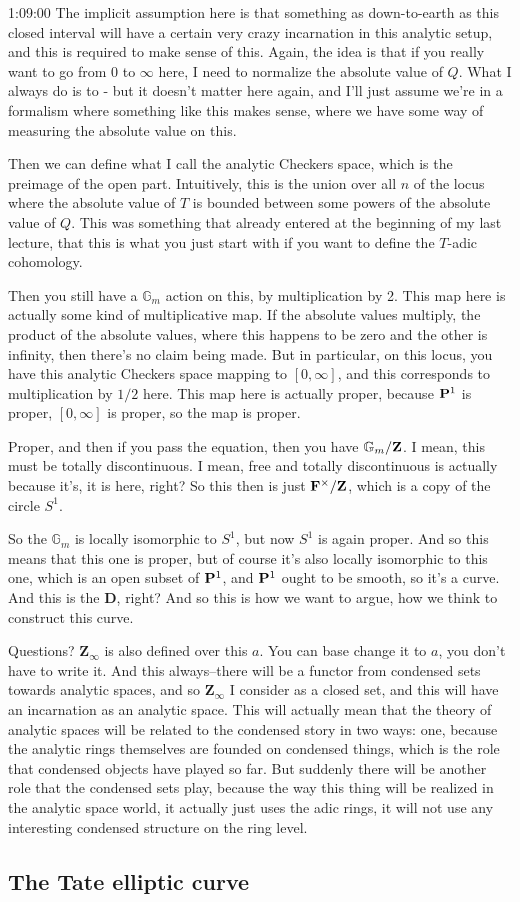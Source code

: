 \begin{unfinished}{1:09:00}
The implicit assumption here is that something as down-to-earth as this closed interval will have a certain very crazy incarnation in this analytic setup, and this is required to make sense of this. Again, the idea is that if you really want to go from 0 to $\infty$ here, I need to normalize the absolute value of $Q$. What I always do is to - but it doesn't matter here again, and I'll just assume we're in a formalism where something like this makes sense, where we have some way of measuring the absolute value on this.

Then we can define what I call the analytic Checkers space, which is the preimage of the open part. Intuitively, this is the union over all $n$ of the locus where the absolute value of $T$ is bounded between some powers of the absolute value of $Q$. This was something that already entered at the beginning of my last lecture, that this is what you just start with if you want to define the $T$-adic cohomology.

Then you still have a $\mathbb{G}_m$ action on this, by multiplication by 2. This map here is actually some kind of multiplicative map. If the absolute values multiply, the product of the absolute values, where this happens to be zero and the other is infinity, then there's no claim being made. But in particular, on this locus, you have this analytic Checkers space mapping to $[0,\infty]$, and this corresponds to multiplication by $1/2$ here. This map here is actually proper, because $\P^1$ is proper, $[0,\infty]$ is proper, so the map is proper.

Proper, and then if you pass the equation, then you have $\mathbb{G}_m / \Z$. I mean, this must be totally discontinuous. I mean, free and totally discontinuous is actually because it's, it is here, right? So this then is just $\F^\times / \Z$, which is a copy of the circle $S^1$. 

So the $\mathbb{G}_m$ is locally isomorphic to $S^1$, but now $S^1$ is again proper. And so this means that this one is proper, but of course it's also locally isomorphic to this one, which is an open subset of $\P^1$, and $\P^1$ ought to be smooth, so it's a curve. And this is the $\mathbf{D}$, right? And so this is how we want to argue, how we think to construct this curve.

Questions? $\mathbf{Z}_\infty$ is also defined over this $a$. You can base change it to $a$, you don't have to write it. And this always--there will be a functor from condensed sets towards analytic spaces, and so $\mathbf{Z}_\infty$ I consider as a closed set, and this will have an incarnation as an analytic space. This will actually mean that the theory of analytic spaces will be related to the condensed story in two ways: one, because the analytic rings themselves are founded on condensed things, which is the role that condensed objects have played so far. But suddenly there will be another role that the condensed sets play, because the way this thing will be realized in the analytic space world, it actually just uses the adic rings, it will not use any interesting condensed structure on the ring level.

\end{unfinished}
\subsection{\ufs The Tate elliptic curve}
